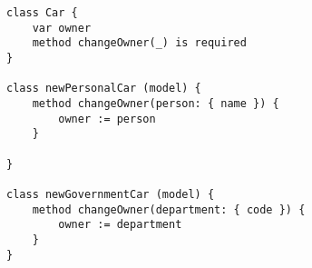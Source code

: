 \begin{lstlisting}[label={code:cars}, caption={A program that defines methods for managing a database of vehicles.}]
class Car {
    var owner
    method changeOwner(_) is required
}

class newPersonalCar (model) {
    method changeOwner(person: { name }) {
        owner := person
    }

}

class newGovernmentCar (model) {
    method changeOwner(department: { code }) {
        owner := department
    }
}
\end{lstlisting}